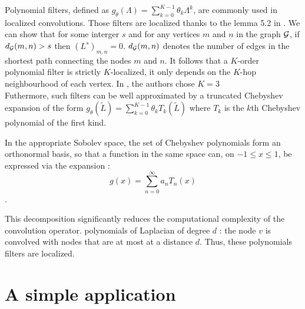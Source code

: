 \documentclass[sigconf]{acmart}
\begin{document}
Polynomial filters, defined as $g_\theta(\Lambda) = \sum_{k=0}^{K-1}\theta_k\Lambda^k$, are commonly used in localized convolutions. Those filters are localized thanks to the lemma 5.2 in \cite{hammond_wavelets_2011}. We can show that for some interger $s$ and for any 
vertices $m$ and $n$ in the graph $\mathcal{G}$, if $d_{\mathcal{G}}(m, n) > s$ then $(L^s)_{m, n} = 0$. $d_{\mathcal{G}}(m, n)$ denotes the number of edges in the shortest path connecting the nodes $m$ and $n$.
It follows that a $K$-order polynomial filter is strictly $K$-localized, \ie it only depends on the $K$-hop neighbourhood of each vertex. In \cite{Parisot17}, the authors chose $K=3$\\ 
Futhermore, such filters can be well approximated by a truncated Chebyshev expansion of the form $g_\theta(\widetilde{L}) = \sum_{k=0}^{K-1}\theta_kT_k(\widetilde{L})$ where $T_k$ is the $k$th Chebyshev polynomial of the first kind.
\begin{lemma}
    In the appropriate Sobolev space, the set of Chebyshev polynomials form an orthonormal basis, so that a function in the same space can, on $-1\leq x \leq 1$, be expressed via the expansion : $$g(x) = \sum_{n=0}^{\infty} a_nT_n(x)$$.
\end{lemma}
This decomposition significantly reduces the computational complexity of the convolution operator.
\cite{kipf_semi-supervised_2017}
polynomials of Laplacian of degree $d$ : the node $v$ is convolved with nodes that are at most at a distance $d$. Thus, these polynomials filters are localized.

\section{A simple application}



\end{document}
